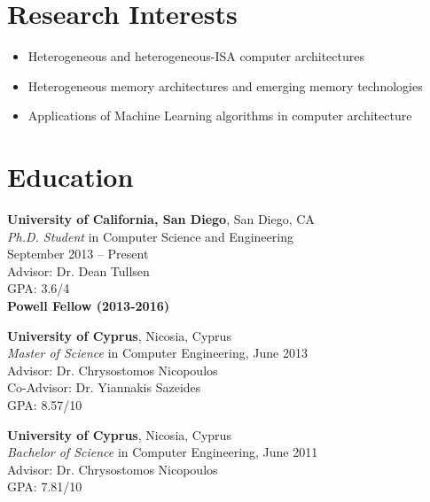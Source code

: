 \documentclass[11pt]{myres} %
\begin{document}
\onehalfspacing


\address{
		  \emph{10545 Ponder Way} \\
		  \emph{San Diego, CA, 92126}}

\address{
		  \href{mailto:prodromou.andreas@gmail.com} 								   {\underline{prodromou.andreas@gmail.com}} \\
		  \emph{tel: (858) 263-5813}}


\begin{resume}

\singlespacing

\section{Research Interests}
	\begin{itemize}
		\item Heterogeneous and heterogeneous-ISA computer architectures
        \item Heterogeneous memory architectures and emerging memory technologies
        \item Applications of Machine Learning algorithms in computer architecture
	\end{itemize}

\section{Education}
\noindent
	{\color{blue}\textbf{University of California, San Diego}, San Diego, CA} \\
	\emph{Ph.D. Student} in Computer Science and Engineering \\
	September 2013 -- Present \\
	Advisor: Dr. Dean Tullsen \\
	GPA: 3.6/4 \\
	\textbf{Powell Fellow (2013-2016)}

	{\color{blue}\textbf{University of Cyprus}, Nicosia, Cyprus} \\
	\emph{Master of Science} in Computer Engineering, June 2013 \\
	Advisor: Dr. Chrysostomos Nicopoulos \\
	Co-Advisor: Dr. Yiannakis Sazeides \\
	GPA: 8.57/10

	{\color{blue}\textbf{University of Cyprus}, Nicosia, Cyprus} \\
	\emph{Bachelor of Science} in Computer Engineering, June 2011 \\
	Advisor: Dr. Chrysostomos Nicopoulos \\
	GPA: 7.81/10


\end{resume}
\end{document}
